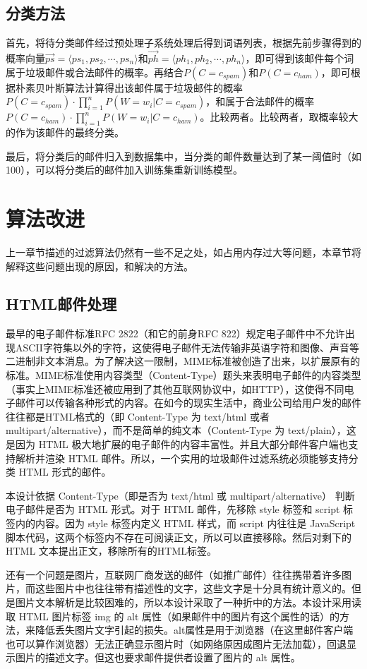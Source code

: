 \documentclass[UTF8,zihao=-4]{ctexart}
\begin{document}
\subsection{分类方法}
	首先，将待分类邮件经过预处理子系统处理后得到词语列表，根据先前步骤得到的概率向量$\vec{ps}=\langle ps_1,ps_2,\cdots,ps_n\rangle$和$\vec{ph}=\langle ph_1,ph_2,\cdots,ph_n\rangle$，即可得到该邮件每个词属于垃圾邮件或合法邮件的概率。再结合$P(C=c_{spam})$和$P(C=c_{ham})$，即可根据朴素贝叶斯算法计算得出该邮件属于垃圾邮件的概率$P(C=c_{spam}) \cdot \prod\limits_{i=1}^{n} P(W=w_i|C=c_{spam})$，和属于合法邮件的概率$P(C=c_{ham}) \cdot \prod\limits_{i=1}^{n} P(W=w_i|C=c_{ham})$。比较两者。比较两者，取概率较大的作为该邮件的最终分类。
	
	最后，将分类后的邮件归入到数据集中，当分类的邮件数量达到了某一阈值时（如100），可以将分类后的邮件加入训练集重新训练模型。

\newpage
\section{算法改进}
	上一章节描述的过滤算法仍然有一些不足之处，如占用内存过大等问题，本章节将解释这些问题出现的原因，和解决的方法。
\subsection{HTML邮件处理}
	最早的电子邮件标准RFC 2822（和它的前身RFC 822）规定电子邮件中不允许出现ASCII字符集以外的字符，这使得电子邮件无法传输非英语字符和图像、声音等二进制非文本消息。为了解决这一限制，MIME标准被创造了出来，以扩展原有的标准。MIME标准使用内容类型（Content-Type）题头来表明电子邮件的内容类型（事实上MIME标准还被应用到了其他互联网协议中，如HTTP），这使得不同电子邮件可以传输各种形式的内容。在如今的现实生活中，商业公司给用户发的邮件往往都是HTML格式的（即 Content-Type 为 text/html 或者 multipart/alternative），而不是简单的纯文本（Content-Type 为 text/plain），这是因为 HTML 极大地扩展的电子邮件的内容丰富性。并且大部分邮件客户端也支持解析并渲染 HTML 邮件。所以，一个实用的垃圾邮件过滤系统必须能够支持分类 HTML 形式的邮件。
	
	本设计依据 Content-Type（即是否为 text/html 或 multipart/alternative） 判断电子邮件是否为 HTML 形式。对于 HTML 邮件，先移除 style 标签和 script 标签内的内容。因为 style 标签内定义 HTML 样式，而 script 内往往是 JavaScript 脚本代码，这两个标签内不存在可阅读正文，所以可以直接移除。然后对剩下的 HTML 文本提出正文，移除所有的HTML标签。
	
	还有一个问题是图片，互联网厂商发送的邮件（如推广邮件）往往携带着许多图片，而这些图片中也往往带有描述性的文字，这些文字是十分具有统计意义的。但是图片文本解析是比较困难的，所以本设计采取了一种折中的方法。本设计采用读取 HTML 图片标签 img 的 alt 属性（如果邮件中的图片有这个属性的话）的方法，来降低丢失图片文字引起的损失。alt属性是用于浏览器（在这里邮件客户端也可以算作浏览器）无法正确显示图片时（如网络原因成图片无法加载），回退显示图片的描述文字。但这也要求邮件提供者设置了图片的 alt 属性。
\end{document}
